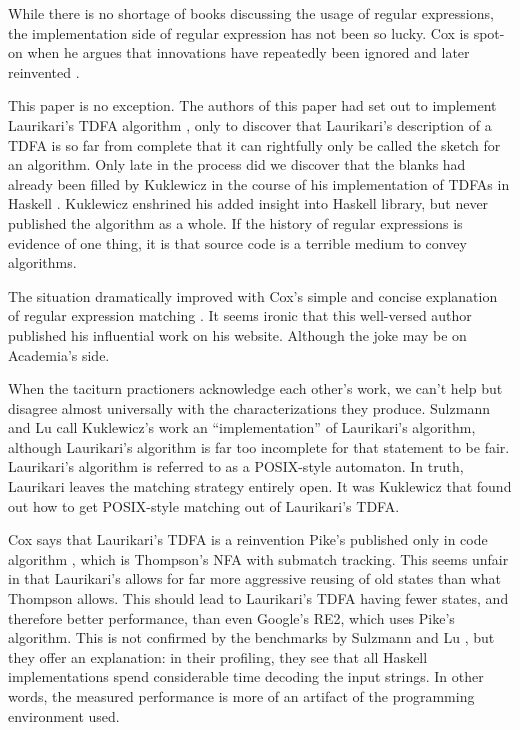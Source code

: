 \documentclass[english]{sigplanconf}
\begin{document}
While there is no shortage of books discussing the usage of regular
expressions, the implementation side of regular expression has not
been so lucky. Cox is spot-on when he argues that innovations have
repeatedly been ignored and later reinvented \cite{Cox2007}. 

This paper is no exception. The authors of this paper had set out
to implement Laurikari's TDFA algorithm \cite{laurikari2000nfas},
only to discover that Laurikari's description of a TDFA is so far
from complete that it can rightfully only be called the sketch for
an algorithm. Only late in the process did we discover that the blanks
had already been filled by Kuklewicz in the course of his implementation
of TDFAs in Haskell \cite{Kuklewicz2007}. Kuklewicz enshrined his
added insight into Haskell library, but never published the algorithm
as a whole. If the history of regular expressions is evidence of one
thing, it is that source code is a terrible medium to convey algorithms. 

The situation dramatically improved with Cox's simple and concise
explanation of regular expression matching \cite{Cox2007}. It seems
ironic that this well-versed author published his influential work
on his website. Although the joke may be on Academia's side.

When the taciturn practioners acknowledge each other's work, we can't
help but disagree almost universally with the characterizations they
produce. Sulzmann and Lu \cite{sulzmann2012regular} call Kuklewicz's
work an ``implementation'' of Laurikari's algorithm, although Laurikari's
algorithm is far too incomplete for that statement to be fair. Laurikari's
algorithm is referred to as a POSIX-style automaton. In truth, Laurikari
leaves the matching strategy entirely open. It was Kuklewicz that
found out how to get POSIX-style matching out of Laurikari's TDFA. 

Cox says that Laurikari's TDFA is a reinvention Pike's published only
in code algorithm \cite{Pike1987}, which is Thompson's NFA with submatch
tracking. This seems unfair in that Laurikari's allows for far more
aggressive reusing of old states than what Thompson allows. This should
lead to Laurikari's TDFA having fewer states, and therefore better
performance, than even Google's RE2, which uses Pike's algorithm.
This is not confirmed by the benchmarks by Sulzmann and Lu \cite{sulzmann2012regular},
but they offer an explanation: in their profiling, they see that all
Haskell implementations spend considerable time decoding the input
strings. In other words, the measured performance is more of an artifact
of the programming environment used. 
\end{document}
